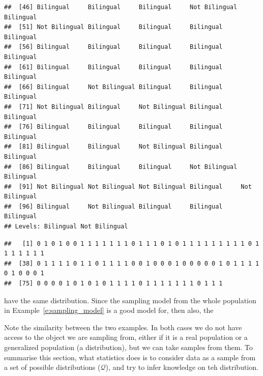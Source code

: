 \begin{example}[Sampling 2]
\begin{knitrout}
\begin{kframe}
\begin{verbatim}
##  [46] Bilingual     Bilingual     Bilingual     Not Bilingual Bilingual    
##  [51] Not Bilingual Bilingual     Bilingual     Bilingual     Bilingual    
##  [56] Bilingual     Bilingual     Bilingual     Bilingual     Bilingual    
##  [61] Bilingual     Bilingual     Bilingual     Bilingual     Bilingual    
##  [66] Bilingual     Not Bilingual Bilingual     Bilingual     Bilingual    
##  [71] Not Bilingual Bilingual     Not Bilingual Bilingual     Bilingual    
##  [76] Bilingual     Bilingual     Bilingual     Bilingual     Bilingual    
##  [81] Bilingual     Bilingual     Not Bilingual Bilingual     Bilingual    
##  [86] Bilingual     Bilingual     Bilingual     Not Bilingual Bilingual    
##  [91] Not Bilingual Not Bilingual Not Bilingual Bilingual     Not Bilingual
##  [96] Bilingual     Not Bilingual Bilingual     Bilingual     Bilingual    
## Levels: Bilingual Not Bilingual
\end{verbatim}
\begin{alltt}
\hldef{(}    \hldef{=} \hldef{,}  \hldef{=} \hldef{(} \hlopt{==} \hldef{)))}
\end{alltt}
\begin{verbatim}
##   [1] 0 1 0 1 0 0 1 1 1 1 1 1 1 0 1 1 1 0 1 0 1 1 1 1 1 1 1 1 1 0 1 1 1 1 1 1 1
##  [38] 0 1 1 1 1 0 1 1 0 1 1 1 1 0 0 1 0 0 0 1 0 0 0 0 0 1 0 1 1 1 1 0 1 0 0 0 1
##  [75] 0 0 0 0 1 0 1 0 1 0 1 1 1 1 0 1 1 1 1 1 1 1 0 1 1 1
\end{verbatim}
\begin{alltt}
\end{alltt}
\end{kframe}
\end{knitrout}
	have the same distribution. Since the sampling model from the whole population in Example~\ref{e:sampling_model} is a good model for, then also, the 
	\end{example}

	Note the similarity between the two examples. In both cases we do not have access to the object we are sampling from, either if it is a real population or a generalized population (a distribution), but we can take samples from them. To summarise this section, what statistics does is to consider data as a sample from a set of possible distributions ($\mathcal Q$), and try to infer knowledge on teh distribution. 


